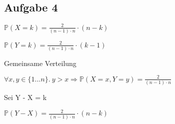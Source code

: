 \documentclass[10pt,a4paper,parskip=half]{scrartcl}
\begin{document}
\subsection*{Aufgabe 4}
\begin{center}
$\mathbb{P}(X=k) = \frac{2}{(n-1)\cdot n} \cdot (n-k)$ \\
\end{center}
\begin{center}
$\mathbb{P}(Y=k) = \frac{2}{(n-1)\cdot n} \cdot (k-1)$ \\
\end{center}
Gemeinsame Verteilung
\begin{center}
$\forall x,y \in \{1...n\} . ~y > x \Rightarrow \mathbb{P}(X=x, Y=y) = \frac{2}{(n-1)\cdot n}$
\end{center}
Sei Y - X = k \\
\begin{center}
$\mathbb{P}(Y-X) = \frac{2}{(n-1)\cdot n} \cdot (n-k)$ \\
\end{center}
\end{document}
